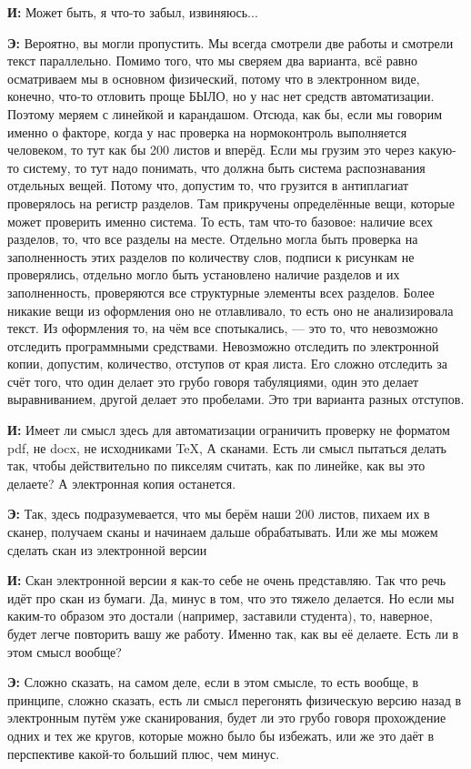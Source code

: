 \textbf{И: }Может быть, я что-то забыл, извиняюсь...

\textbf{Э: }Вероятно, вы могли пропустить. Мы всегда смотрели две работы и смотрели текст параллельно. Помимо того, что мы сверяем два варианта, всё равно осматриваем мы в основном физический, потому что в электронном виде, конечно, что-то отловить проще БЫЛО, но у нас нет средств автоматизации. Поэтому меряем с линейкой и карандашом. Отсюда, как бы, если мы говорим именно о факторе, когда у нас проверка на нормоконтроль  выполняется человеком, то тут как бы 200 листов и вперёд. Если мы грузим это через какую-то систему, то тут надо понимать, что должна быть система распознавания отдельных вещей. Потому что, допустим то, что грузится в антиплагиат проверялось на регистр разделов. Там прикручены определённые вещи, которые может проверить именно система. То есть, там что-то базовое: наличие всех разделов, то, что все разделы на месте. Отдельно могла быть проверка на заполненность этих разделов по количеству слов, подписи к рисункам не проверялись, отдельно могло быть установлено наличие разделов и их заполненность, проверяются все структурные элементы всех разделов. Более никакие вещи из оформления оно не отлавливало, то есть оно не анализировала текст. Из оформления то, на чём все спотыкались, --- это то, что невозможно отследить программными средствами. Невозможно отследить по электронной копии, допустим, количество, отступов от края листа. Его сложно отследить за счёт того, что один делает это грубо говоря табуляциями, один это делает выравниванием, другой делает это пробелами. Это три варианта разных отступов.

\textbf{И: }Имеет ли смысл здесь для автоматизации ограничить проверку не форматом pdf, не docx, не исходниками TeX, А сканами. Есть ли смысл пытаться делать так, чтобы действительно по пикселям считать, как по линейке, как вы это делаете? А электронная копия останется.

\textbf{Э: }Так, здесь подразумевается, что мы берём наши 200 листов, пихаем их в сканер, получаем сканы и начинаем дальше обрабатывать. Или же мы можем сделать скан из электронной версии

\textbf{И: }Скан электронной версии я как-то себе не очень представляю. Так что речь идёт про скан из бумаги. Да, минус в том, что это тяжело делается. Но если мы каким-то образом это достали (например, заставили студента), то, наверное, будет легче повторить вашу же работу. Именно так, как вы её делаете. Есть ли в этом смысл вообще?

\textbf{Э: }Сложно сказать, на самом деле, если в этом смысле, то есть вообще, в принципе, сложно сказать, есть ли смысл перегонять физическую версию назад в электронным путём уже сканирования, будет ли это грубо говоря прохождение одних и тех же кругов, которые можно было бы избежать, или же это даёт в перспективе какой-то больший плюс, чем минус.

